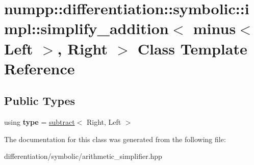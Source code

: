\hypertarget{classnumpp_1_1differentiation_1_1symbolic_1_1impl_1_1simplify__addition_3_01minus_3_01Left_01_4_00_01Right_01_4}{}\section{numpp\+:\+:differentiation\+:\+:symbolic\+:\+:impl\+:\+:simplify\+\_\+addition$<$ minus$<$ Left $>$, Right $>$ Class Template Reference}
\label{classnumpp_1_1differentiation_1_1symbolic_1_1impl_1_1simplify__addition_3_01minus_3_01Left_01_4_00_01Right_01_4}
\subsection*{Public Types}
\begin{DoxyCompactItemize}
\item 
\mbox{\label{classnumpp_1_1differentiation_1_1symbolic_1_1impl_1_1simplify__addition_3_01minus_3_01Left_01_4_00_01Right_01_4_a60e8ae72e35f7d8bb372ba0adba54afb}} 
using {\bfseries type} = \hyperlink{classnumpp_1_1differentiation_1_1symbolic_1_1subtract}{subtract}$<$ Right, Left $>$
\end{DoxyCompactItemize}


The documentation for this class was generated from the following file\+:\begin{DoxyCompactItemize}
\item 
differentiation/symbolic/arithmetic\+\_\+simplifier.\+hpp\end{DoxyCompactItemize}
